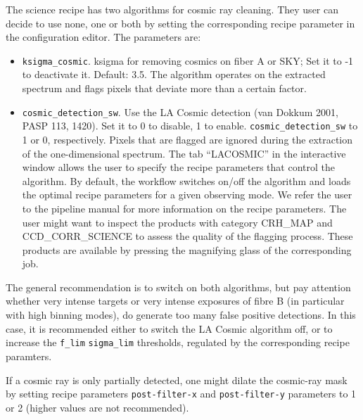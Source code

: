 The science recipe has two algorithms for cosmic ray cleaning. They user can decide to use none, one or both
by setting the corresponding recipe parameter in the configuration editor.
The parameters are:
\begin{itemize}

\item {\tt ksigma\_cosmic}. ksigma for removing cosmics on fiber A or
  SKY; Set it to -1 to deactivate it. Default: 3.5. The algorithm
  operates on the extracted spectrum and flags pixels that deviate
  more than a certain factor.
  
\item {\tt cosmic\_detection\_sw}. Use the LA Cosmic detection (van
  Dokkum 2001, PASP 113, 1420). Set it to 0 to disable, 1 to enable.
  {\tt cosmic\_detection\_sw} to 1 or 0, respectively. Pixels that are flagged
  are ignored during the extraction of the one-dimensional
  spectrum. The tab “LACOSMIC” in the interactive window allows the
  user to specify the recipe parameters that control the algorithm. By
  default, the workflow switches on/off the algorithm and loads the
  optimal recipe parameters for a given observing mode. We refer the
  user to the pipeline manual for more information on the recipe
  parameters. The user might want to inspect the products with
  category CRH\_MAP and CCD\_CORR\_SCIENCE to assess the quality of
  the flagging process. These products are available by pressing the
  magnifying glass of the corresponding job.
 
\end{itemize}

The general recommendation is to switch on both algorithms, but pay
attention whether very intense targets or very intense exposures of
fibre B (in particular with high binning modes), do generate too many
false positive detections. In this case, it is recommended either to
switch the LA Cosmic algorithm off, or to increase the {\tt f\_lim}
{\tt sigma\_lim} thresholds, regulated by the corresponding recipe paramters.

If a cosmic ray is only partially detected, one might dilate the
cosmic-ray mask by setting recipe parameters {\tt post-filter-x} and
{\tt post-filter-y} parameters to 1 or 2 (higher values are not
recommended).


